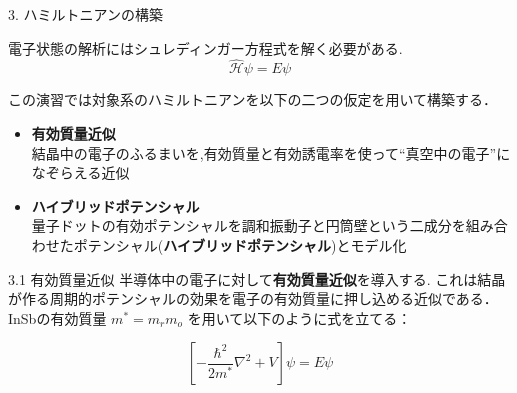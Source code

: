 \documentclass{beamer}
\begin{document}

\begin{frame}{3. ハミルトニアンの構築}

  電子状態の解析にはシュレディンガー方程式を解く必要がある.
  \begin{equation}
    \hat{\mathcal{H} } \psi = E \psi
  \end{equation}  
  
  この演習では対象系のハミルトニアンを以下の二つの仮定を用いて構築する．
  \begin{itemize}
    \item \textbf{有効質量近似}  \\
    \rightarrow 結晶中の電子のふるまいを,有効質量と有効誘電率を使って“真空中の電子”になぞらえる近似
    \item \textbf{ハイブリッドポテンシャル}  \\
    \rightarrow 量子ドットの有効ポテンシャルを調和振動子と円筒壁という二成分を組み合わせたポテンシャル(\textbf{ハイブリッドポテンシャル})とモデル化
  \end{itemize}
\end{frame}
  
\begin{frame}{3.1 有効質量近似}
  半導体中の電子に対して\textbf{有効質量近似}を導入する.
  これは結晶が作る周期的ポテンシャルの効果を電子の有効質量に押し込める近似である．
  InSbの有効質量 $m^*=m_rm_o$ を用いて以下のように式を立てる：

  \begin{equation}
    \left[ -\frac{\hbar^2}{2 m^*} \nabla^2 + V \right] \psi = E \psi
  \end{equation}
  

\end{frame}  
\end{document}
